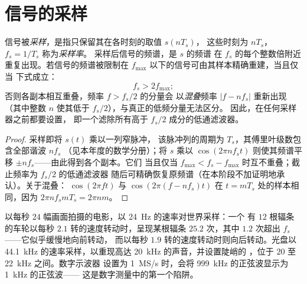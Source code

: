 \section{信号的采样}

\begin{theorem}\label{thm:b2:feedback-oscillators:shannon}
信号被\emph{采样}，是指只保留其在各时刻的取值 $s(nT_s)$，
这些时刻为 $nT_s$，$f_s = 1/T_s$ 称为\emph{采样率}。
采样后信号的频谱，是 $s$ 的频谱
在 $f_s$ 的每个整数倍附近重复出现。若信号的频谱被限制在
$f_{\max}$ 以下的信号可由其样本精确重建，当且仅当
下式成立：
\[
f_s > 2f_{\max} ;
\]
否则各副本相互重叠，频率 $f > f_s/2$ 的分量会
以\emph{混叠}频率 $|f - nf_s|$ 重新出现（其中整数 $n$
使其低于 $f_s/2$），与真正的低频分量无法区分。
因此，在任何采样器之前都要设置\emph{}，
即一个滤除所有高于 $f_s/2$ 成分的低通滤波器。
\end{theorem}

\begin{proof}
采样即将 $s(t)$ 乘以一列窄脉冲，
该脉冲列的周期为 $T_s$，其傅里叶级数包含全部谐波 $nf_s$
（见本年度的数学分册）；将 $s$ 乘以 $\cos(2\pi nf_st)$
则使其频谱平移 $\pm nf_s$——由此得到各个副本。它们
当且仅当 $f_{\max} < f_s - f_{\max}$ 时互不重叠；截止频率为 $f_s/2$ 的低通滤波器
随后可精确恢复原频谱（在本阶段不加证明地承认）。关于混叠：
$\cos(2\pi ft)$ 与 $\cos(2\pi(f - nf_s)t)$ 在 $t = mT_s$
处的样本相同，因为 $2\pi nf_smT_s = 2\pi nm$。
\end{proof}

\begin{example}[车轮、光盘与示波器]\label{ex:b2:feedback-oscillators:alias}
以每秒 $24$ 幅画面拍摄的电影，以 \qty{24}{Hz} 的速率对世界采样：一个
有 $12$ 根辐条的车轮以每秒 $2.1$ 转的速度转动时，呈现某根辐条
$25.2$ 次，其中 $1.2$ 次超出 $f_s$——它似乎缓慢地向前转动，
而以每秒 $1.9$ 转的速度转动时则向后转动。光盘以
\qty{44.1}{kHz} 的速率采样，以重现高达 \qty{20}{kHz} 的声音，并设置陡峭的
，位于 $20$ 至 \qty{22}{kHz} 之间。数字示波器
设置为 \qty{1}{MS/s} 时，会将 \qty{999}{kHz} 的正弦波显示为 \qty{1}{kHz} 的正弦波——
这是数字测量中的第一个陷阱。
\end{example}

